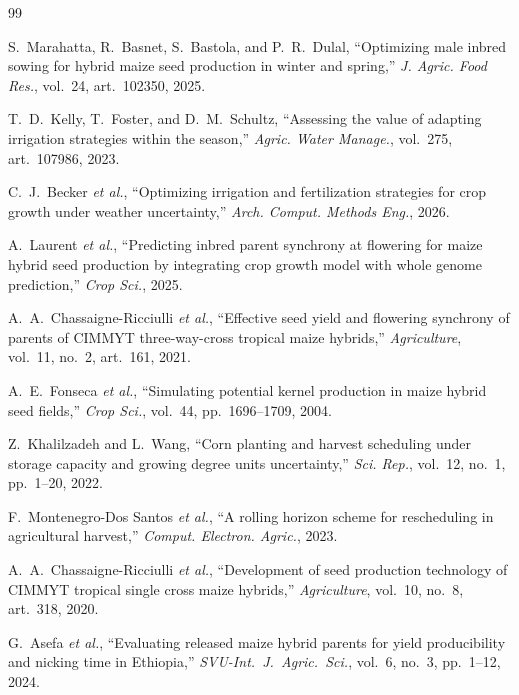 \documentclass[10pt,twocolumn]{article}
\begin{document}
\begin{thebibliography}{99}
\scriptsize\linespread{0.94}\selectfont
\setlength{\itemsep}{0pt}\setlength{\parskip}{0pt}

S.~Marahatta, R.~Basnet, S.~Bastola, and P.~R.~Dulal,
``Optimizing male inbred sowing for hybrid maize seed production in winter and
spring,'' \textit{J. Agric. Food Res.}, vol.~24, art.~102350, 2025.

T.~D.~Kelly, T.~Foster, and D.~M.~Schultz,
``Assessing the value of adapting irrigation strategies within the season,''
\textit{Agric. Water Manage.}, vol.~275, art.~107986, 2023.

C.~J.~Becker \textit{et al.},
``Optimizing irrigation and fertilization strategies for crop growth under
weather uncertainty,'' \textit{Arch. Comput. Methods Eng.}, 2026.

A.~Laurent \textit{et al.},
``Predicting inbred parent synchrony at flowering for maize hybrid seed
production by integrating crop growth model with whole genome prediction,''
\textit{Crop Sci.}, 2025.

A.~A.~Chassaigne-Ricciulli \textit{et al.},
``Effective seed yield and flowering synchrony of parents of CIMMYT
three-way-cross tropical maize hybrids,'' \textit{Agriculture}, vol.~11,
no.~2, art.~161, 2021.

A.~E.~Fonseca \textit{et al.},
``Simulating potential kernel production in maize hybrid seed fields,''
\textit{Crop Sci.}, vol.~44, pp.~1696--1709, 2004.

Z.~Khalilzadeh and L.~Wang,
``Corn planting and harvest scheduling under storage capacity and growing
degree units uncertainty,'' \textit{Sci. Rep.}, vol.~12, no.~1, pp.~1--20, 2022.

F.~Montenegro-Dos Santos \textit{et al.},
``A rolling horizon scheme for rescheduling in agricultural harvest,''
\textit{Comput. Electron. Agric.}, 2023.

A.~A.~Chassaigne-Ricciulli \textit{et al.},
``Development of seed production technology of CIMMYT tropical single cross
maize hybrids,'' \textit{Agriculture}, vol.~10, no.~8, art.~318, 2020.

G.~Asefa \textit{et al.},
``Evaluating released maize hybrid parents for yield producibility and
nicking time in Ethiopia,''
\textit{SVU-Int.\ J.\ Agric.\ Sci.}, vol.~6, no.~3, pp.~1--12, 2024.


\end{thebibliography}
\end{document}
